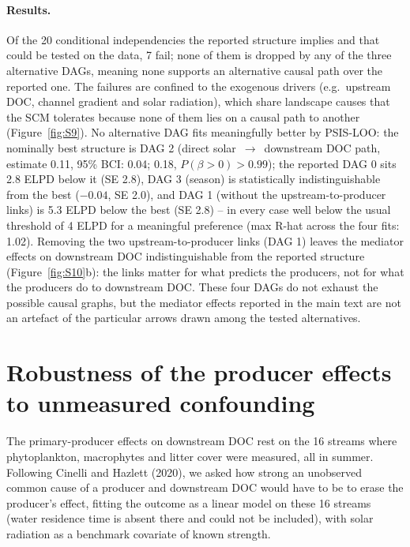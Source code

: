 \documentclass[11pt,a4paper]{article}
\begin{document}
\paragraph{Results.} Of the 20 conditional independencies the reported structure implies and that could be tested on the data, 7 fail; none of them is dropped by any of the three alternative DAGs, meaning none supports an alternative causal path over the reported one. The failures are confined to the exogenous drivers (e.g.\ upstream DOC, channel gradient and solar radiation), which share landscape causes that the SCM tolerates because none of them lies on a causal path to another (Figure~\ref{fig:S9}). No alternative DAG fits meaningfully better by PSIS-LOO: the nominally best structure is DAG 2 (direct solar~$\rightarrow$~downstream DOC path, estimate 0.11, 95\% BCI: 0.04; 0.18, $P(\beta>0) > 0.99$); the reported DAG 0 sits 2.8 ELPD below it (SE 2.8), DAG 3 (season) is statistically indistinguishable from the best ($-0.04$, SE 2.0), and DAG 1 (without the upstream-to-producer links) is 5.3 ELPD below the best (SE 2.8) -- in every case well below the usual threshold of 4 ELPD for a meaningful preference (max R-hat across the four fits: 1.02). Removing the two upstream-to-producer links (DAG 1) leaves the mediator effects on downstream DOC indistinguishable from the reported structure (Figure~\ref{fig:S10}b): the links matter for what predicts the producers, not for what the producers do to downstream DOC. These four DAGs do not exhaust the possible causal graphs, but the mediator effects reported in the main text are not an artefact of the particular arrows drawn among the tested alternatives.

\FloatBarrier
\section*{Robustness of the producer effects to unmeasured confounding}

The primary-producer effects on downstream DOC rest on the 16 streams where phytoplankton, macrophytes and litter cover were measured, all in summer. Following Cinelli and Hazlett (2020), we asked how strong an unobserved common cause of a producer and downstream DOC would have to be to erase the producer's effect, fitting the outcome as a linear model on these 16 streams (water residence time is absent there and could not be included), with solar radiation as a benchmark covariate of known strength.
\end{document}
